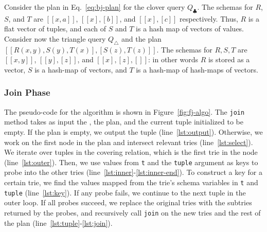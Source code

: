 \begin{example}
  Consider the plan in Eq.~\eqref{eq:bj-plan} for the clover query
  $Q_\clubsuit$.  The \GHT schemas for $R$, $S$, and $T$ are
  $[[x, a]]$, $[[x], [b]]$, and $[[x], [c]]$ respectively.  Thus, $R$
  is a flat vector of tuples, and each of $S$ and $T$ is a hash map of
  vectors of values.  Consider now the triangle query $Q_{\triangle}$
  and the plan $[[R(x,y),S(y),T(x)],[S(z),T(z)]]$.  The \GHT
  schemas for $R, S, T$ are $[[x,y]]$, $[[y],[z]]$, and $[[x],[z],[]]$:
  in other words $R$ is stored as a vector, $S$ is a hash-map of
  vectors, and $T$ is a hash-map of hash-maps of vectors.
\end{example}

\subsubsection*{Join Phase}
The pseudo-code for the \FJ algorithm is shown in Figure~\ref{fig:fj-algo}.
The \lstinline|join| method takes as input the \GHTs, the \FJ plan, 
  and the current tuple initialized to be empty.
If the plan is empty, we output the tuple (line~\ref{lst:output}).
Otherwise, we work on the first node in the plan
  and intersect relevant tries (line~\ref{lst:select}).
We iterate over tuples in the covering relation, 
  which is the first trie in the node (line~\ref{lst:outer}).
%
%
Then, we use values from \lstinline|t| 
  and the \lstinline|tuple| argument
  as keys to probe into the other tries 
  (line~\ref{lst:inner}-\ref{lst:inner-end}).
To construct a key for a certain trie, 
  we find the values mapped from the trie's schema variables
  in \lstinline|t| and \lstinline|tuple| (line~\ref{lst:key}).
If any probe fails, we continue to the next tuple in the outer loop.
If all probes succeed, we replace the original tries with the 
  subtries returned by the probes,
  and recursively call \lstinline|join| 
  on the new tries and the rest of the plan (line~\ref{lst:tuple}-\ref{lst:join}).

